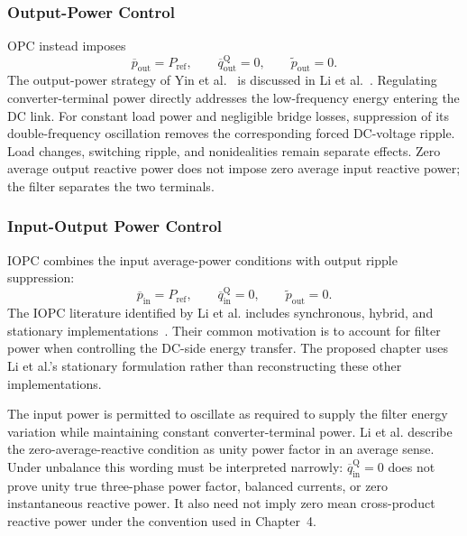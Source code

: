 \subsubsection{Output-Power Control}
OPC instead imposes
\begin{equation}
\overline p_{\mathrm{out}}=P_{\mathrm{ref}},\qquad
\overline q_{\mathrm{out}}^{\mathrm Q}=0,\qquad
\widetilde p_{\mathrm{out}}=0.
\label{eq:ch5-opc-objectives}
\end{equation}
The output-power strategy of Yin et al.~\cite{ch5-yin2008} is discussed in Li et al.~\cite{li2010journal}. Regulating converter-terminal power directly addresses the low-frequency energy entering the DC link. For constant load power and negligible bridge losses, suppression of its double-frequency oscillation removes the corresponding forced DC-voltage ripple. Load changes, switching ripple, and nonidealities remain separate effects. Zero average output reactive power does not impose zero average input reactive power; the filter separates the two terminals.

\subsubsection{Input-Output Power Control}
IOPC combines the input average-power conditions with output ripple suppression:
\begin{equation}
\boxed{\overline p_{\mathrm{in}}=P_{\mathrm{ref}},\qquad
\overline q_{\mathrm{in}}^{\mathrm Q}=0,\qquad
\widetilde p_{\mathrm{out}}=0.}
\label{eq:ch5-iopc-objectives}
\end{equation}
The IOPC literature identified by Li et al. includes synchronous, hybrid, and stationary implementations~\cite{ch5-suh2002pesc,ch5-suh2002ias,ch5-suh2006hybrid,ch5-suh2006model,wu2008,ch5-wu2008repetitive,ch5-stankovic2001}. Their common motivation is to account for filter power when controlling the DC-side energy transfer. The proposed chapter uses Li et al.'s stationary formulation rather than reconstructing these other implementations.

The input power is permitted to oscillate as required to supply the filter energy variation while maintaining constant converter-terminal power. Li et al. describe the zero-average-reactive condition as unity power factor in an average sense. Under unbalance this wording must be interpreted narrowly: $\overline q_{\mathrm{in}}^{\mathrm Q}=0$ does not prove unity true three-phase power factor, balanced currents, or zero instantaneous reactive power. It also need not imply zero mean cross-product reactive power under the convention used in Chapter~4.

